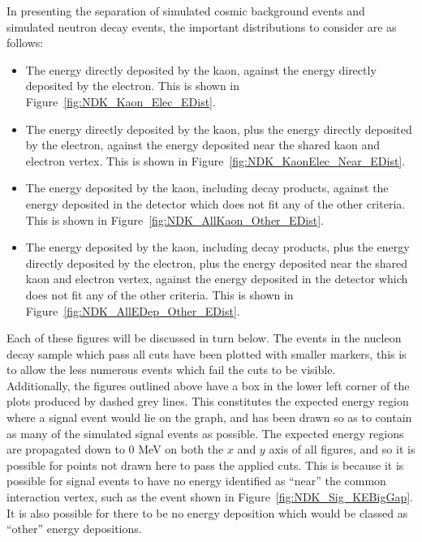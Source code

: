In presenting the separation of simulated cosmic background events and simulated neutron decay events, the important distributions to consider are as follows:
\begin{itemize}
\item The energy directly deposited by the kaon, against the energy directly deposited by the electron. This is shown in Figure~\ref{fig:NDK_Kaon_Elec_EDist}.
\item The energy directly deposited by the kaon, plus the energy directly deposited by the electron, against the energy deposited near the shared kaon and electron vertex. This is shown in Figure~\ref{fig:NDK_KaonElec_Near_EDist}.
\item The energy deposited by the kaon, including decay products, against the energy deposited in the detector which does not fit any of the other criteria. This is shown in Figure~\ref{fig:NDK_AllKaon_Other_EDist}.
\item The energy deposited by the kaon, including decay products, plus the energy directly deposited by the electron, plus the energy deposited near the shared kaon and electron vertex, against the energy deposited in the detector which does not fit any of the other criteria. This is shown in Figure~\ref{fig:NDK_AllEDep_Other_EDist}.
\end{itemize}
Each of these figures will be discussed in turn below. The events in the nucleon decay sample which pass all cuts have been plotted with smaller markers, this is to allow the less numerous events which fail the cuts to be visible. \\

Additionally, the figures outlined above have a box in the lower left corner of the plots produced by dashed grey lines. This constitutes the expected energy region where a signal event would lie on the graph, and has been drawn so as to contain as many of the simulated signal events as possible. The expected energy regions are propagated down to 0 MeV on both the $x$ and $y$ axis of all figures, and so it is possible for points not drawn here to pass the applied cuts. This is because it is possible for signal events to have no energy identified as ``near'' the common interaction vertex, such as the event shown in Figure~\ref{fig:NDK_Sig_KEBigGap}. It is also possible for there to be no energy deposition which would be classed as ``other'' energy depositions. \\

